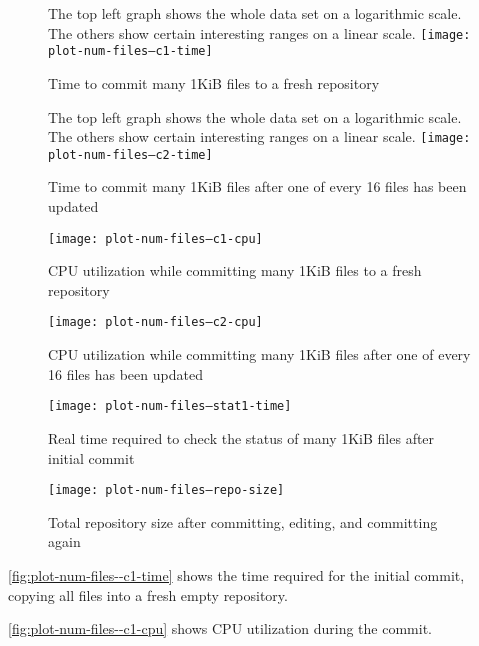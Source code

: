 \begin{figure}[p]
    \caption{Time to commit many 1KiB files to a fresh repository}
    \label{fig:plot-num-files--c1-time}
    \centering
    The top left graph shows the whole data set on a logarithmic scale. The
    others show certain interesting ranges on a linear scale.
    \texttt{[image: plot-num-files--c1-time]}
\end{figure}

\begin{figure}[p]
    \caption{Time to commit many 1KiB files after one of every \num{16} files
    has been updated}
    \label{fig:plot-num-files--c2-time}
    \centering
    The top left graph shows the whole data set on a logarithmic scale. The
    others show certain interesting ranges on a linear scale.
    \texttt{[image: plot-num-files--c2-time]}
\end{figure}

\begin{figure}[p]
  \caption{CPU utilization while committing many 1KiB files to a fresh
  repository}
  \label{fig:plot-num-files--c1-cpu}
  \centering
    \texttt{[image: plot-num-files--c1-cpu]}
\end{figure}

\begin{figure}[p]
    \caption{CPU utilization while committing many 1KiB files after one of every
        \num{16} files has been updated}
  \label{fig:plot-num-files--c2-cpu}
  \centering
    \texttt{[image: plot-num-files--c2-cpu]}
\end{figure}

\begin{figure}[p]
  \caption{Real time required to check the status of many 1KiB files after
  initial commit}
  \label{fig:plot-num-files--stat1-time}
  \centering
    \texttt{[image: plot-num-files--stat1-time]}
\end{figure}

\begin{figure}[p]
  \caption{Total repository size after committing, editing, and committing again}
  \label{fig:plot-num-files--repo-size}
  \centering
    \texttt{[image: plot-num-files--repo-size]}
\end{figure}

\autoref{fig:plot-num-files--c1-time} shows the time
required for the initial commit, copying all files into a fresh empty
repository.

\autoref{fig:plot-num-files--c1-cpu} shows CPU utilization
during the commit.

